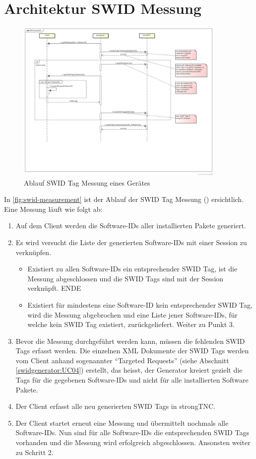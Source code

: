 \section{Architektur SWID Messung}
\begin{figure}[H]
\centering
\includegraphics[width=0.9\textwidth]{./images/architecture/SWID_strongTNC.png}
\caption{Ablauf SWID Tag Messung eines Gerätes}
\label{fig:swid-measurement}
\end{figure}
In \autoref{fig:swid-measurement} ist der Ablauf der SWID Tag Messung () ersichtlich.
Eine Messung läuft wie folgt ab:
\begin{enumerate}
\item Auf dem Client werden die Software-IDs aller installierten Pakete generiert. 
\item Es wird versucht die Liste der generierten Software-IDs mit einer Session zu verknüpfen.
	\begin{itemize}
	\item Existiert zu allen Software-IDs ein entsprechender SWID Tag, ist die Messung abgeschlossen und die SWID Tags sind mit der Session verknüpft. ENDE
	\item Existiert für mindestens eine Software-ID kein entsprechender SWID Tag, wird die Messung abgebrochen und eine Liste jener Software-IDs, für welche kein SWID Tag existiert, zurückgeliefert. Weiter zu Punkt 3.
	\end{itemize}
	\item Bevor die Messung durchgeführt werden kann, müssen die fehlenden SWID Tags
	erfasst werden. Die einzelnen XML Dokumente der SWID Tags werden vom Client
	anhand sogenannter \enquote{Targeted Requests} (siehe Abschnitt \ref{swidgenerator:UC04})
	erstellt, das heisst, der Generator kreiert gezielt die Tags für die gegebenen
	Software-IDs und nicht für alle installierten Software Pakete. \item Der Client
	erfasst alle neu generierten SWID Tags in strongTNC. \item Der Client startet
	erneut eine Messung und übermittelt nochmals alle Software-IDs. Nun sind für
	alle Software-IDs die entsprechenden SWID Tags vorhanden und die Messung wird
	erfolgreich abgeschlossen. Ansonsten weiter zu Schritt 2.
\end{enumerate}
